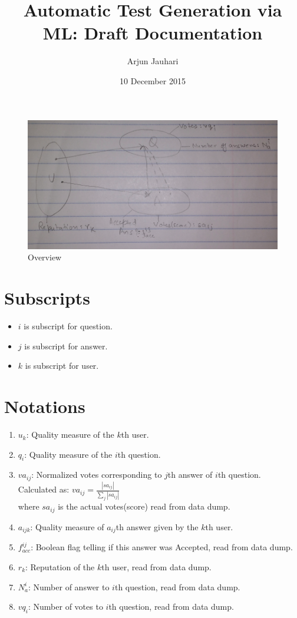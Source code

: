 \documentclass{article}
\title{Automatic Test Generation via ML: Draft Documentation}
\author{Arjun Jauhari}
\date{10 December 2015}
\begin{document}
\maketitle

\begin{figure}[H]
\centering
\includegraphics[width=14cm]{overview.png}
\caption{Overview}
\label{fig1:overview}
\end{figure}

\section*{Subscripts}
\begin{itemize}
    \item $i$ is subscript for question.
    \item $j$ is subscript for answer.
    \item $k$ is subscript for user.
\end{itemize}
\section*{Notations}
\begin{enumerate}
    \item $u_k$: Quality measure of the $k$th user.
    \item $q_i$: Quality measure of the $i$th question.
    \item $va_{ij}$: Normalized votes corresponding to $j$th answer of $i$th question. \\
        Calculated as: $va_{ij} = \frac{|sa_{ij}|}{\sum_{j} |sa_{ij}|}$ \\
        where $sa_{ij}$ is the actual votes(score) read from data dump.
    \item $a_{ijk}$: Quality measure of $a_{ij}$th answer given by the $k$th user.
    \item $f_{acc}^{ij}$: Boolean flag telling if this answer was Accepted, read from data dump.
    \item $r_k$: Reputation of the $k$th user, read from data dump.
    \item $N_{a}^{i}$: Number of answer to $i$th question, read from data dump.
    \item $vq_{i}$: Number of votes to $i$th question, read from data dump.
\end{enumerate}
\end{document}

